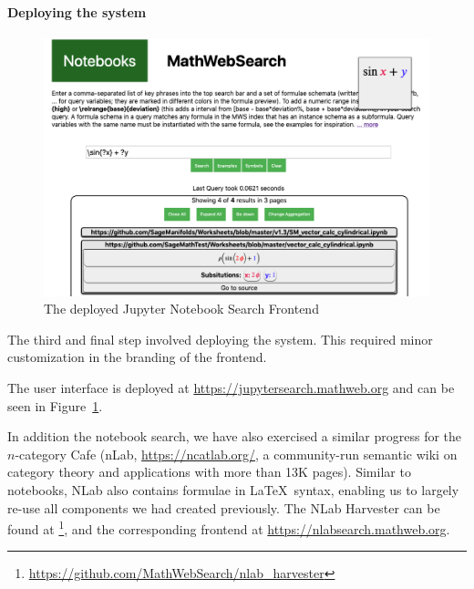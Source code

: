 \paragraph{Deploying the system}

\begin{figure}[ht]
  \includegraphics[width=\textwidth]{mwsnotebookfront.png}
  \caption{The deployed Jupyter Notebook Search Frontend}\label{fig:mwsnotebookfront}
\end{figure}

The third and final step involved deploying the system.
This required minor customization in the branding of the frontend. 

The user interface is deployed at \url{https://jupytersearch.mathweb.org} and can be seen in Figure~\ref{fig:mwsnotebookfront}.

In addition the notebook search, we have also exercised a similar progress for the $n$-category Cafe (nLab, \url{https://ncatlab.org/}, a community-run semantic wiki on category theory and applications with more than 13K pages). 
Similar to notebooks, NLab also contains formulae in \LaTeX\ syntax, enabling us to largely re-use all components we had created previously.  The NLab Harvester can be found at \footnote{\url{https://github.com/MathWebSearch/nlab_harvester}}, and the corresponding frontend at \url{https://nlabsearch.mathweb.org}.


